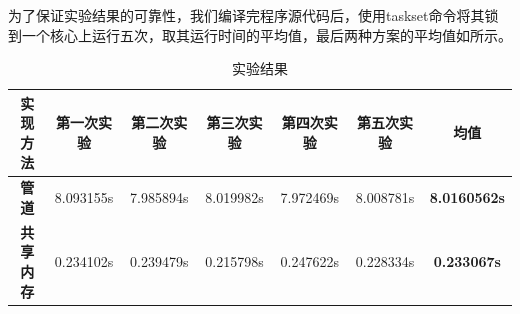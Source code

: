 \documentclass[lang=cn,a4paper,newtx]{elegantpaper}
\begin{document}
为了保证实验结果的可靠性，我们编译完程序源代码后，使用taskset命令将其锁到一个核心上运行五次，取其运行时间的平均值，最后两种方案的平均值如所示。



\begin{table}[htbp]
\centering
\caption{实验结果}
\label{table:res}
\begin{tabular}{ccccccc}
\hline
\textbf{实现方法} & \textbf{第一次实验} & \textbf{第二次实验} & \textbf{第三次实验} & \textbf{第四次实验} & \textbf{第五次实验} & \textbf{均值} \\ \hline
\textbf{管道}   & 8.093155s      & 7.985894s      & 8.019982s      & 7.972469s      & 8.008781s      &  \textbf{8.0160562s}           \\
\textbf{共享内存} & 0.234102s      & 0.239479s      & 0.215798s      & 0.247622s      & 0.228334s      &\textbf{0.233067s}             \\ \hline
\end{tabular}

\end{table}
\end{document}
